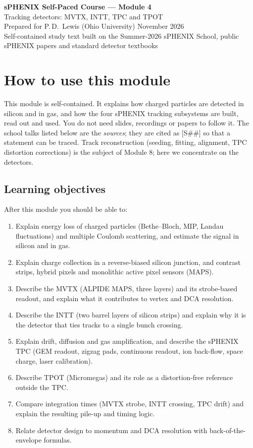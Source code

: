 \documentclass[11pt,letterpaper]{article}
\begin{document}
\begin{center}{\LARGE\bfseries sPHENIX Self-Paced Course --- Module 4}\\[4pt]
{\Large Tracking detectors: MVTX, INTT, TPC and TPOT}\\[8pt]
Prepared for P.\,D.\ Lewis (Ohio University) \quad November 2026\\[2pt]
\small Self-contained study text built on the Summer-2026 sPHENIX School, public sPHENIX papers and standard detector textbooks\end{center}

\tableofcontents
\newpage

\section*{How to use this module}
This module is self-contained.
It explains how charged particles are detected in silicon and in gas, and how the four sPHENIX tracking subsystems are built, read out and used.
You do not need slides, recordings or papers to follow it.
The school talks listed below are the \emph{sources}; they are cited as [S\#\#] so that a statement can be traced.
Track reconstruction (seeding, fitting, alignment, TPC distortion corrections) is the subject of Module 8; here we concentrate on the detectors.

\subsection*{Learning objectives}
After this module you should be able to:
\begin{enumerate}[label=O\arabic*.]
\item Explain energy loss of charged particles (Bethe--Bloch, MIP, Landau fluctuations) and multiple Coulomb scattering, and estimate the signal in silicon and in gas.
\item Explain charge collection in a reverse-biased silicon junction, and contrast strips, hybrid pixels and monolithic active pixel sensors (MAPS).
\item Describe the MVTX (ALPIDE MAPS, three layers) and its strobe-based readout, and explain what it contributes to vertex and DCA resolution.
\item Describe the INTT (two barrel layers of silicon strips) and explain why it is the detector that ties tracks to a single bunch crossing.
\item Explain drift, diffusion and gas amplification, and describe the sPHENIX TPC (GEM readout, zigzag pads, continuous readout, ion back-flow, space charge, laser calibration).
\item Describe TPOT (Micromegas) and its role as a distortion-free reference outside the TPC.
\item Compare integration times (MVTX strobe, INTT crossing, TPC drift) and explain the resulting pile-up and timing logic.
\item Relate detector design to momentum and DCA resolution with back-of-the-envelope formulas.
\end{enumerate}
\end{document}
